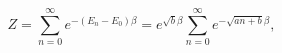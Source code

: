 \begin{equation}
Z=\sum_{n=0}^{\infty}e^{-(E_n-E_0)\beta}=e^{\sqrt{b}\beta}\sum_{n=0}^{\infty}
e^{-\sqrt{an+b}\beta}, \label{Z} \end{equation}

